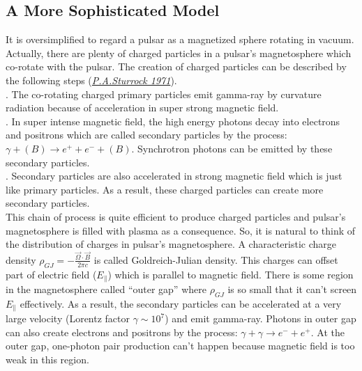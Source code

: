 \documentclass[12pt]{report}
\begin{document}
          
        \subsection{A More Sophisticated Model}
              It is oversimplified to regard a pulsar as a magnetized sphere rotating in vacuum. Actually,
              there are plenty of 
              charged particles in a pulsar's magnetosphere which co-rotate with the pulsar. The creation of 
              charged particles can 
              be described by the following steps 
              (\href{http://articles.adsabs.harvard.edu/cgi-bin/nph-iarticle\_query?1971...164..529S&amp;data
              \_type=PDF\_HIGH&amp;whole\_paper=YES&amp;type=PRINTER&amp;filetype=.pdf}{\textit{P.A.Sturrock
              1971}}). \\ 
              . The co-rotating charged primary particles emit gamma-ray by curvature radiation 
              because of acceleration in super strong magnetic field.  \\
              . In super intense magnetic field,  the high energy photons decay into electrons and 
              positrons which are called secondary particles by the process: 
              $\gamma + (B) \rightarrow e^++e^-+(B)$. Synchrotron 
                                  photons can be emitted by these secondary particles. \\
              . Secondary particles are also accelerated in strong magnetic field which is just like 
              primary particles. As a result, these charged particles can create more secondary particles. \\
              \indent This chain of process is quite efficient to produce charged particles and pulsar's 
              magnetosphere is filled with plasma as a consequence. So, it is natural to think of the 
              distribution of charges in pulsar's magnetosphere. A characteristic charge density 
              $\rho_{GJ}=-\frac{\vec{\Omega}\cdot \vec{B}}{2\pi c}$ is called Goldreich-Julian density. 
              This charges can offset part of electric field ($E_{\parallel}$) which is parallel to magnetic 
              field. There is some region in the magnetosphere called ``outer gap'' where $\rho_{GJ}$ is so 
              small that it can't screen $E_{\parallel}$ effectively. As a result, the secondary particles can 
              be accelerated at a very large velocity (Lorentz factor $\gamma\sim 10^7$) and emit gamma-ray. 
              Photons in outer gap can also create electrons and positrons by the process: 
              $\gamma+\gamma\rightarrow e^-+e^+$. At the outer gap, one-photon pair production can't happen 
              because magnetic field is too weak in this region.
            
\end{document}
